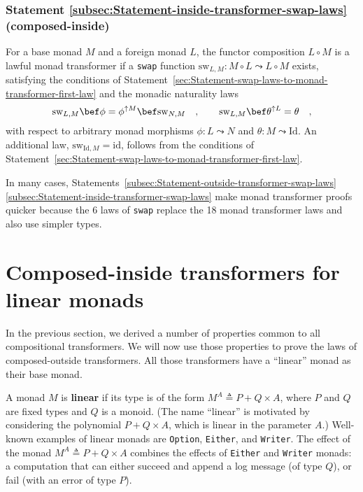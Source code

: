 \subsubsection{Statement \label{subsec:Statement-inside-transformer-swap-laws}\ref{subsec:Statement-inside-transformer-swap-laws}
(composed-inside)}

For a base monad $M$ and a foreign monad $L$, the functor composition
$L\circ M$ is a lawful monad transformer if a \lstinline!swap! function
$\text{sw}_{L,M}:M\circ L\leadsto L\circ M$ exists, satisfying the
conditions of Statement~\ref{sec:Statement-swap-laws-to-monad-transformer-first-law}
and the monadic naturality laws
\[
\text{sw}_{L,M}\bef\phi=\phi^{\uparrow M}\bef\text{sw}_{N,M}\quad,\quad\quad\text{sw}_{L,M}\bef\theta^{\uparrow L}=\theta\quad,
\]
with respect to arbitrary monad morphisms $\phi:L\leadsto N$ and
$\theta:M\leadsto\text{Id}$. An additional law, $\text{sw}_{\text{Id},M}=\text{id}$,
follows from the conditions of Statement~\ref{sec:Statement-swap-laws-to-monad-transformer-first-law}.

In many cases, Statements~\ref{subsec:Statement-outside-transformer-swap-laws}\textendash \ref{subsec:Statement-inside-transformer-swap-laws}
make monad transformer proofs quicker because the 6 laws of \lstinline!swap!
replace the 18 monad transformer laws and also use simpler types.

\section{Composed-inside transformers for linear monads\label{sec:transformers-linear-monads}}

In the previous section, we derived a number of properties common
to all compositional transformers. We will now use those properties
to prove the laws of composed-outside transformers. All those transformers
have a \textsf{``}linear\textsf{''} monad as their base monad.

A monad $M$ is\textbf{ linear} if its type
is of the form $M^{A}\triangleq P+Q\times A$, where $P$ and $Q$
are fixed types and $Q$ is a monoid. (The name \textsf{``}linear\textsf{''} is motivated
by considering the polynomial $P+Q\times A$, which is linear in the
parameter $A$.) Well-known examples of linear monads are \lstinline!Option!,
\lstinline!Either!, and \lstinline!Writer!. The effect of the monad
$M^{A}\triangleq P+Q\times A$ combines the effects of \lstinline!Either!
and \lstinline!Writer! monads: a computation that can either succeed
and append a log message (of type $Q$), or fail (with an error of
type $P$).


